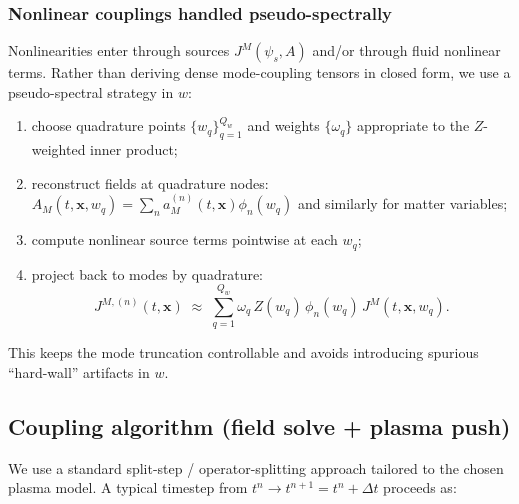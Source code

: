 \documentclass[11pt]{article}
\newcommand{\x}{\mathbf{x}}     %
\newcommand{\A}{A}              %
\newcommand{\J}{J}              %
\newcommand{\Z}{Z}              %
\newcommand{\phin}{\phi_n}
\begin{document}
\subsubsection*{Nonlinear couplings handled pseudo-spectrally}

Nonlinearities enter through sources \(\J^M(\psi_s,\A)\) and/or through fluid
nonlinear terms. Rather than deriving dense mode-coupling tensors in closed form,
we use a pseudo-spectral strategy in \(w\):
\begin{enumerate}[leftmargin=1.6em]
\item choose quadrature points \(\{w_q\}_{q=1}^{Q_w}\) and weights \(\{\omega_q\}\)
appropriate to the \(\Z\)-weighted inner product;
\item reconstruct fields at quadrature nodes:
\(\A_M(t,\x,w_q)=\sum_{n}a_M^{(n)}(t,\x)\phin(w_q)\) and similarly for matter variables;
\item compute nonlinear source terms pointwise at each \(w_q\);
\item project back to modes by quadrature:
\begin{equation}
J^{M,(n)}(t,\x)\;\approx\;\sum_{q=1}^{Q_w}\omega_q\,\Z(w_q)\,\phin(w_q)\,J^M(t,\x,w_q).
\end{equation}
\end{enumerate}
This keeps the mode truncation controllable and avoids introducing spurious
``hard-wall'' artifacts in \(w\).

\subsection{Coupling algorithm (field solve + plasma push)}
\label{sec:coupling_algorithm}

We use a standard split-step / operator-splitting approach tailored to the chosen
plasma model. A typical timestep from \(t^n\to t^{n+1}=t^n+\Delta t\) proceeds as:
\end{document}
